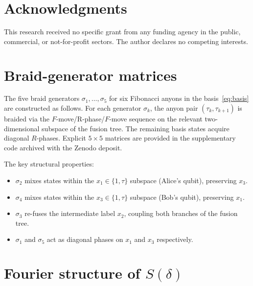 \documentclass[aps,pra,twocolumn,superscriptaddress,longbibliography,floatfix,nofootinbib]{revtex4-2}
\begin{document}
\section*{Acknowledgments}
This research received no specific grant from any funding agency in the
public, commercial, or not-for-profit sectors. The author declares no
competing interests.

\appendix

\section{Braid-generator matrices}
\label{app:generators}

The five braid generators $\sigma_1,\ldots,\sigma_5$ for six
Fibonacci anyons in the basis~\eqref{eq:basis} are constructed
as follows.
For each generator $\sigma_k$, the anyon pair $(\tau_k,\tau_{k+1})$
is braided via the $F$-move/R-phase/$F$-move sequence on the
relevant two-dimensional subspace of the fusion tree.
The remaining basis states acquire diagonal $R$-phases.
Explicit $5\times 5$ matrices are provided in the supplementary
code archived with the Zenodo deposit.

The key structural properties:
\begin{itemize}
\item $\sigma_2$ mixes states within the $x_1\in\{1,\tau\}$
subspace (Alice's qubit), preserving $x_3$.
\item $\sigma_4$ mixes states within the $x_3\in\{1,\tau\}$
subspace (Bob's qubit), preserving $x_1$.
\item $\sigma_3$ re-fuses the intermediate label $x_2$, coupling
both branches of the fusion tree.
\item $\sigma_1$ and $\sigma_5$ act as diagonal phases on $x_1$
and $x_3$ respectively.
\end{itemize}

\section{Fourier structure of $S(\delta)$}
\label{app:fourier}
\end{document}
